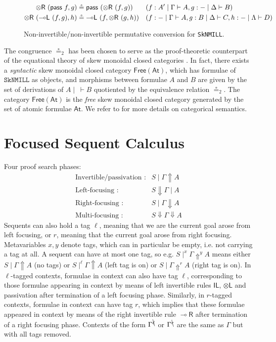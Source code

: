 \documentclass[runningheads]{llncs}
\newcommand{\tl}{\otimes \mathsf{L}}
\newcommand{\tr}{\otimes \mathsf{R}}
\newcommand{\lright}{{\multimap}\mathsf{R}}
\newcommand{\lleft}{{\multimap}\mathsf{L}}
\newcommand{\pass}{\mathsf{pass}}
\newcommand{\unitl}{\mathsf{IL}}
\newcommand{\otL}{\tl}
\newcommand{\lolliR}{\lright}
\newcommand{\IL}{\unitl}
\newcommand{\SkNMILL}{\texttt{SkNMILL}}
\newcommand{\FSkMCC}{\mathsf{Free}}
\newcommand{\up}{\Uparrow}
\newcommand{\dn}{\Downarrow}
\newcommand{\At}{\mathsf{At}}
\begin{document}
\begin{figure}[t]
\begin{align*}\small
  \tr \text{ } (\pass \text{ } f, g) &\circeq \pass \text{ } (\tr \text{ } (f, g)) &&(f : A' \mid \Gamma \vdash A, g : - \mid \Delta \vdash B)
  \\
  \tr \text{ } (\lleft \text{ } (f , g), h) & \circeq \lleft \text{ } (f, \tr \text{ } (g, h)) &&(f: - \mid \Gamma \vdash A, g : B \mid \Delta \vdash C, h : - \mid \Lambda \vdash D)
\end{align*}
\caption{Non-invertible/non-invertible permutative conversion for \SkNMILL.}
\label{fig:circeq2}
\end{figure}

The congruence $\circeq_2$ has been chosen to serve as the proof-theoretic counterpart of the equational theory of skew monoidal closed categories \cite{street:skew-closed:2013}.
In fact, there exists a \emph{syntactic} skew monoidal closed category $\FSkMCC(\At)$, which has formulae of $\SkNMILL$ as objects, and morphisms between formulae $A$ and $B$ are given by the set of derivations of $A \mid ~ \vdash B$ quotiented by the equivalence relation $\circeq_2$. The category $\FSkMCC(\At)$ is the \emph{free} skew monoidal closed category generated by the set of atomic formulae $\At$. We refer to \cite{UVW:protsn} for more details on categorical semantics.





\section{Focused Sequent Calculus}
\label{sec:focus}
Four proof search phases:
\[
\begin{array}{rl}
  \text{Invertible/passivation :} &  S \mid \Gamma \up A \\
  \text{Left-focusing :} &  S \dn \Gamma \mid A \\
  \text{Right-focusing :} &  S \mid \Gamma \dn A \\
  \text{Multi-focusing :} &  S \dn \Gamma \dn A
\end{array}
\]
Sequents can also hold a tag $\ell$, meaning that we are the current goal arose from left focusing, or $r$, meaning that the current goal arose from right focusing. Metavariables $x,y$  denote tags, which can in particular be empty, i.e. not carrying a tag at all. A sequent can have at most one tag, so e.g. $S \mid^x \Gamma \up^y A$ means either $S \mid \Gamma \up A$ (no tags) or $S \mid^\ell \Gamma \up A$ (left tag is on) or $S \mid \Gamma \up^r A$ (right tag is on). In $\ell$-tagged contexts, formulae in context can also have tag $\ell$, corresponding to those formulae appearing in context by means of left invertible rules $\IL$, $\otL$ and passivation after termination of a left focusing phase. Similarly, in $r$-tagged contexts, formulae in context can have tag $r$, which implies that these formulae appeared in context by means of the right invertible rule $\lolliR$ after termination of a right focusing phase. Contexts of the form $\Gamma^{\bcancel{\ell}}$ or $\Gamma^{\bcancel{r}}$ are the same as $\Gamma$ but with all tags removed.
\end{document}
